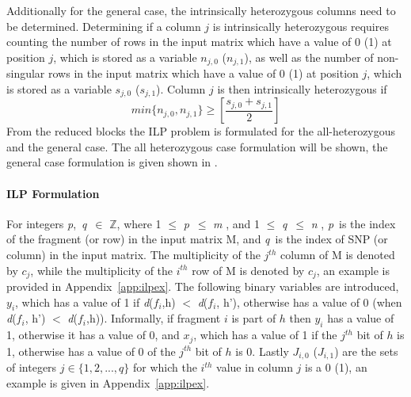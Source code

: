 \documentclass[10pt,a4paer,twocolumn]{article}
\newcommand{\M}{\textit{m }}
\newcommand{\N}{\textit{n }}
\newcommand{\D}{\textit{d}}
\newcommand{\PP}{\textit{p}}
\newcommand{\QQ}{\textit{q}}
\begin{document}
Additionally for the general case, the intrinsically heterozygous columns need to be determined. 
Determining if a column $j$ is intrinsically heterozygous requires counting the number of rows in the input matrix which
have a value of 0 (1) at position $j$, which is stored as a variable $n_{j,0}$ ($n_{j,1}$), as well as the
number of non-singular rows in the input matrix which have a value of 0 (1) at position $j$, which is stored
as a variable $s_{j,0}$ ($s_{j,1}$). Column $j$ is then intrinsically heterozygous if
\begin{equation*}
    min\{n_{j,0},n_{j,1}\} \ge \left[ \frac{s_{j,0} + s_{j,1}}{2} \right]
\end{equation*}
From the reduced blocks the ILP problem is formulated for the all-heterozygous and the general case. The
all heterozygous case formulation will be shown, the general case formulation is given shown in
\cite{sup:2013}. 

\paragraph{ILP Formulation} \label{ssec:ilpform}

For integers \PP,\ \QQ\ $\in$ $\mathbb{Z}$, where 1 $\le$ \PP\ $\le$ \M, and 1 $\le$ \QQ\ $\le$ \N, \PP\ is the 
index of the fragment (or row) in the input matrix M, and \QQ\ is the index of SNP (or column) in the input 
matrix. The multiplicity of the $j^{th}$ column of M is denoted by $c_j$, while the multiplicity of the
$i^{th}$ row of M is denoted by $c_j$, an example is provided in Appendix~\ref{app:ilpex}. The following 
binary variables are introduced, $y_i$, which has a value of 1 if \D($f_i$,h) $<$ \D($f_i$, h'), otherwise 
has a value of 0 (when \D($f_i$, h') $<$ \D($f_i$,h)). Informally, if fragment $i$ is part of $h$ then $y_i$ 
has a value of 1, otherwise it has a value of 0, and $x_j$, which has a value of 1 if the $j^{th}$ bit of 
$h$ is 1, otherwise has a value of 0 of the $j^{th}$ bit of $h$ is 0. 
Lastly $J_{i,0}$ ($J_{i,1}$) are the sets of integers $j \in \{1,2,...,q\}$ for which 
the $i^{th}$ value in column $j$ is a 0 (1), an example is given in Appendix~\ref{app:ilpex}.
\end{document}
